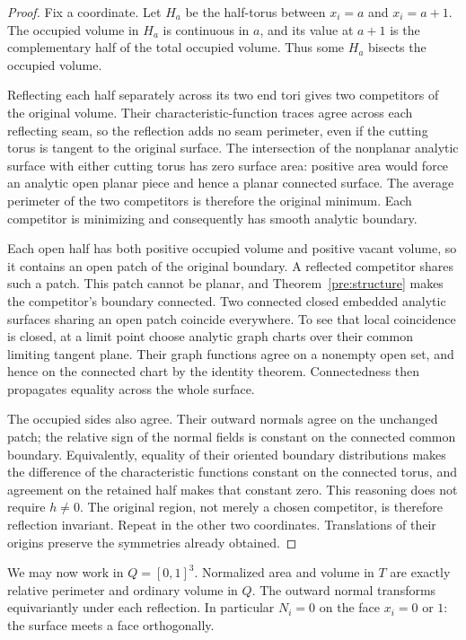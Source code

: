 \begin{proof}
Fix a coordinate. Let \(H_a\) be the half-torus between \(x_i=a\) and
\(x_i=a+1\). The occupied volume in \(H_a\) is continuous in \(a\),
and its value at \(a+1\) is the complementary half of the total occupied
volume. Thus some \(H_a\) bisects the occupied volume.

Reflecting each half separately across its two end tori gives two
competitors of the original volume. Their characteristic-function traces
agree across each reflecting seam, so the reflection adds no seam
perimeter, even if the cutting torus is tangent to the original surface.
The intersection of the nonplanar analytic surface with either cutting
torus has zero surface area: positive area would force an analytic open
planar piece and hence a planar connected surface. The average perimeter
of the two competitors is therefore the original minimum. Each competitor
is minimizing and consequently has smooth analytic boundary.

Each open half has both positive occupied volume and positive vacant
volume, so it contains an open patch of the original boundary.
A reflected competitor shares such a patch. This patch cannot be planar,
and Theorem~\ref{pre:structure} makes the competitor's boundary connected.
Two connected closed embedded analytic surfaces sharing an open patch
coincide everywhere. To see that local coincidence is closed, at a limit
point choose analytic graph charts over their common limiting tangent
plane. Their graph functions agree on a nonempty open set, and hence
on the connected chart by the identity theorem.
Connectedness then propagates equality across the whole surface.

The occupied sides also agree. Their outward normals agree on the
unchanged patch; the relative sign of the normal fields is constant on
the connected common boundary. Equivalently, equality of their oriented
boundary distributions makes the difference of the characteristic
functions constant on the connected torus, and agreement on the retained
half makes that constant zero. This reasoning does not require \(h\ne0\).
The original region, not merely a chosen competitor, is therefore
reflection invariant. Repeat in the other two coordinates. Translations
of their origins preserve the symmetries already obtained.
\end{proof}

We may now work in \(Q=[0,1]^3\). Normalized area and volume in \(T\)
are exactly relative perimeter and ordinary volume in \(Q\). The outward
normal transforms equivariantly under each reflection. In particular
\(N_i=0\) on the face \(x_i=0\) or \(1\): the surface meets a face
orthogonally.

